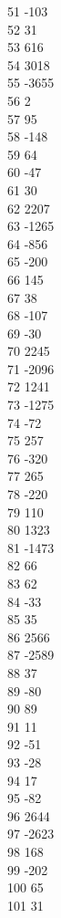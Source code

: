 { 51	-103 \\
 52	31 \\
 53	616 \\
 54	3018 \\
 55	-3655 \\
 56	2 \\
 57	95 \\
 58	-148 \\
 59	64 \\
 60	-47 \\
 61	30 \\
 62	2207 \\
 63	-1265 \\
 64	-856 \\
 65	-200 \\
 66	145 \\
 67	38 \\
 68	-107 \\
 69	-30 \\
 70	2245 \\
 71	-2096 \\
 72	1241 \\
 73	-1275 \\
 74	-72 \\
 75	257 \\
 76	-320 \\
 77	265 \\
 78	-220 \\
 79	110 \\
 80	1323 \\
 81	-1473 \\
 82	66 \\
 83	62 \\
 84	-33 \\
 85	35 \\
 86	2566 \\
 87	-2589 \\
 88	37 \\
 89	-80 \\
 90	89 \\
 91	11 \\
 92	-51 \\
 93	-28 \\
 94	17 \\
 95	-82 \\
 96	2644 \\
 97	-2623 \\
 98	168 \\
 99	-202 \\
 100	65 \\
 101	31 \\
}
